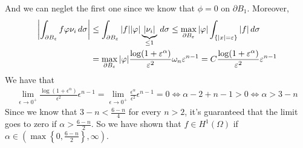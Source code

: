 And we can neglet the first one since we know that $\phi = 0$ on $\partial
    B_1$. Moreover,
\[
    \begin{split}
        \abs{\int_{\partial B_\varepsilon} f \varphi \nu_i \, d\sigma} & \leq \int_{\partial B_\varepsilon} \abs{f} \abs{\varphi} \underbrace{\abs{\nu_i}}_{\leq 1} \, d\sigma \leq \max_{\partial B_\varepsilon} \abs{\varphi} \int_{\{ \abs{x} = \varepsilon \}} \abs{f} \, d\sigma \\
                                                                 & = \max_{\partial B_\varepsilon} \abs{\varphi} \frac{\log(1+\varepsilon^\alpha)}{\varepsilon^2} \omega_n \varepsilon^{n-1} = C \frac{\log(1+\varepsilon^\alpha)}{\varepsilon^2} \varepsilon^{n-1}
    \end{split}
\]
We have that
\[
    \begin{split}
        \lim_{\epsilon \to 0^+} \frac{\log(1+\epsilon^\alpha)}{\epsilon^2} \epsilon^{n-1} = \lim_{\epsilon \to 0^+} \frac{\epsilon^\alpha}{\epsilon^2} \epsilon^{n-1} = 0 \iff \alpha - 2 + n - 1 >  0 \iff \alpha > 3 - n
    \end{split}
\]
Since we know that $3 - n < \frac{6-n}{4}$ for every \(n > 2\), it's guaranteed
that the limit goes to zero if \(\alpha > \frac{6-n}{2}\). So we have shown
that $f \in H^1(\Omega)$ if \(\alpha \in \left(\max\left\{0,
\frac{6-n}{2}\right\}, \infty\right)\).\\

